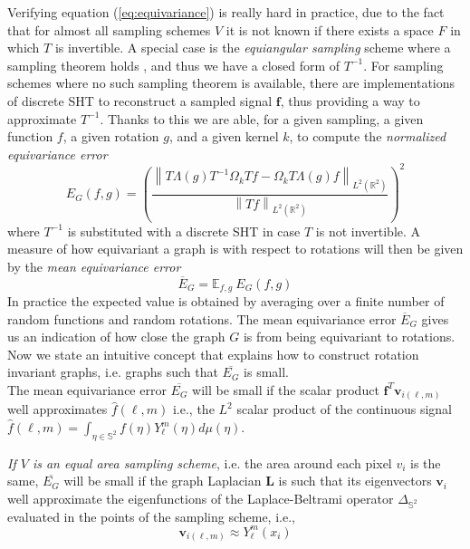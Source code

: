 \documentclass{article} %
\newcommand{\norm}[1]{\left\lVert#1\right\rVert}
\begin{document}
Verifying equation (\ref{eq:equivariance}) is really hard in practice, due to the fact that for almost all sampling schemes $V$ it is not known if there exists a space $F$ in which $T$ is invertible. A special case is the \textit{equiangular sampling} scheme where a sampling theorem holds \cite{Driscoll:1994:CFT:184069.184073}, and thus we have a closed form of $T^{-1}$. For sampling schemes where no such sampling theorem is available, there are implementations of discrete SHT to reconstruct a sampled signal $\mathbf f$, thus providing a way to approximate $T^{-1}$. Thanks to this we are able, for a given sampling, a given function $f$, a given rotation $g$, and a given kernel $k$, to compute the \textit{normalized equivariance error} 
\begin{equation}\label{eq:equivariance error}
E_{G}(f, g) = \left(\frac{ \norm {T \Lambda(g) T^{-1} \Omega_k Tf - \Omega_k T \Lambda(g) f}_{L^2(\mathbb R^2)}}{\norm {Tf}_{L^2(\mathbb R^2)}}\right)^2
\end{equation}
where $T^{-1}$ is substituted with a discrete SHT in case $T$ is not invertible.
A measure of how equivariant a graph is with respect to rotations will then be given by the \textit{mean equivariance error}
\begin{equation}\label{eq:mean equivariance error}
\overline E_G = \mathbb E_{f, g}\ 	E_G(f, g) 
\end{equation}
In practice the expected value is obtained by averaging over a finite number of random functions and random rotations. The mean equivariance error $\overline E_G$ gives us an indication of how close the graph $G$ is from being equivariant to rotations. Now we state an intuitive concept that explains how to construct rotation invariant graphs, i.e. graphs such that $\overline{E_G}$ is small.\\
The mean equivariance error $\overline{E_G}$ will be small if the scalar product $\mathbf f^T \mathbf v_{i(\ell, m)}$ well approximates $\hat {f}(\ell,m)$ i.e., the $L^2$ scalar product of the continuous signal $\hat {f}(\ell,m)= \int_{\eta \in \mathbb S^2}f(\eta)Y_\ell^m(\eta)d\mu(\eta)$.
	
	\textit{If $V$ is an equal area sampling scheme}, i.e. the area around each pixel $v_i$ is the same, $\overline{E_G}$ will be small if the graph Laplacian $\mathbf L$ is such that its eigenvectors $\mathbf v_i$ well approximate the eigenfunctions of the Laplace-Beltrami operator $\Delta_{\mathbb S^2}$ evaluated in the points of the sampling scheme, i.e., 
	$$
	\mathbf v_{i(\ell, m)} \approx Y_\ell^m(x_i)
	$$
\end{document}
